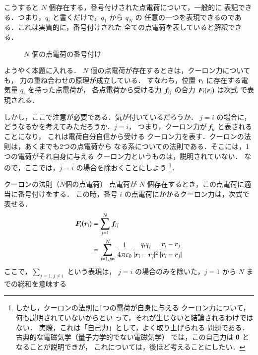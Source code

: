     こうすると $N$ 個存在する，番号付けされた点電荷について，一般的に
    表記できる．つまり，$q_{i}$ と書くだけで，$q_{1}$ から $q_{N}$ の
    任意の一つを表現できるのである．これは実質的に，番号付けされた
    全ての点電荷を表していると解釈できる．
        \begin{figure}[hbt]
            \begin{center}
                \caption{$N$ 個の点電荷の番号付け}
                \label{fig:EM_GenKasaneAwase}
            \end{center}
        \end{figure}

    ようやく本題に入れる．
    $N$ 個の点電荷が存在するときは，クーロン力についても，
    力の重ね合わせの原理が成立している．
    すなわち，位置 $\boldsymbol{r}_{i}$ に存在する電気量 $q_{i}$ を持った点電荷が，
    各点電荷から受ける力 $\boldsymbol{f}_{ij}$ の合力 $\boldsymbol{F}_{i}(\boldsymbol{r}_{i})$ は次式
    で表現される．

    しかし，ここで注意が必要である．気が付いているだろうか．
    $j=i$ の場合に，どうなるかを考えてみただろうか．$j=i$，
    つまり，クーロン力が $\textit{\textbf{{f}}}_{ii}$ と表されることになり，
    これは電荷自分自信から受ける
    クーロン力を表す．クーロンの法則は，あくまでも2つの点電荷から
    なる系についての法則である．そこには，1つの電荷がそれ自身に与える
    クーロン力というものは，説明されていない．
    なので，ここでは，$j=i$ の場合を除おくことにしよう
        \footnote{
            しかし，クーロンの法則に1つの電荷が自身に与える
            クーロン力について，何も説明されていないからとい
            って，それが生じないと結論されるわけではない．
            実際，これは「自己力」として，よく取り上げられる
            問題である．古典的な電磁気学（量子力学的でない電磁気学）
            では，この自己力は $\textbf{{0}}$ となることが説明できが，
            これについては，後ほど考えることにしたい．
        }．
        \begin{myshadebox}{クーロンの法則（$N$個の点電荷）}
            点電荷が $N$ 個存在するとき，この点電荷に適当に番号付けをする．
            この時，番号 $i$ の点電荷にかかるクーロン力は，次式で表せる．
            \begin{align}
                \boldsymbol{F}_{i}(\boldsymbol{r}_{i})&=\sum_{j=1}^{N}\boldsymbol{f}_{ij} \notag \\
                &=\sum_{j=1,j\neq i}^{N}\frac{1}{4\pi\varepsilon_{0}}
                \frac{q_{i}q_{j}}{|\boldsymbol{r}_{i}-\boldsymbol{r}_{j}|^{2}}
                \frac{\boldsymbol{r}_{i}-\boldsymbol{r}_{j}}
                     {|\boldsymbol{r}_{i}-\boldsymbol{r}_{j}|}
            \end{align}
            ここで，$ \displaystyle \sum_{j=1,j\neq i}$ という表現は，
            $j=i$ の場合のみを除いた，$j=1$ から $N$ までの総和を意味する
        \end{myshadebox}


